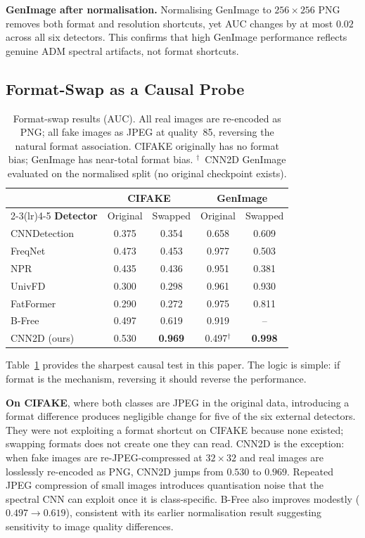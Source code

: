 \documentclass{bmvc2k}
\begin{document}
\noindent\textbf{GenImage after normalisation.}
Normalising GenImage to $256\times256$ PNG removes both format and resolution shortcuts, yet AUC changes by at most $0.02$ across all six detectors. This confirms that high GenImage performance reflects genuine ADM spectral artifacts, not format shortcuts.

\subsection{Format-Swap as a Causal Probe}
\label{sec:swap_results}

\begin{table}[t]
\centering
\small
\setlength{\tabcolsep}{4pt}
\begin{tabular}{lcccc}
\toprule
 & \multicolumn{2}{c}{\textbf{CIFAKE}} & \multicolumn{2}{c}{\textbf{GenImage}} \\
\cmidrule(lr){2-3}\cmidrule(lr){4-5}
\textbf{Detector} & Original & Swapped & Original & Swapped \\
\midrule
CNNDetection~\cite{wang2020cnn} & 0.375 & 0.354 & 0.658 & 0.609 \\
FreqNet~\cite{freqnet}          & 0.473 & 0.453 & 0.977 & 0.503 \\
NPR~\cite{npr}                  & 0.435 & 0.436 & 0.951 & 0.381 \\
UnivFD~\cite{univfd}            & 0.300 & 0.298 & 0.961 & 0.930 \\
FatFormer~\cite{fatformer}      & 0.290 & 0.272 & 0.975 & 0.811 \\
B-Free~\cite{bfree}             & 0.497 & 0.619 & 0.919 & --    \\
CNN2D (ours)                    & 0.530 & \textbf{0.969} & 0.497$^{\dagger}$ & \textbf{0.998} \\
\bottomrule
\end{tabular}
\caption{Format-swap results (AUC). All real images are re-encoded as PNG; all fake images as JPEG at quality~85, reversing the natural format association. CIFAKE originally has no format bias; GenImage has near-total format bias. $^{\dagger}$~CNN2D GenImage evaluated on the normalised split (no original checkpoint exists).}
\label{tab:swap}
\end{table}

Table~\ref{tab:swap} provides the sharpest causal test in this paper. The logic is simple: if format is the mechanism, reversing it should reverse the performance.

\noindent\textbf{On CIFAKE}, where both classes are JPEG in the original data, introducing a format difference produces negligible change for five of the six external detectors. They were not exploiting a format shortcut on CIFAKE because none existed; swapping formats does not create one they can read. CNN2D is the exception: when fake images are re-JPEG-compressed at $32\times32$ and real images are losslessly re-encoded as PNG, CNN2D jumps from $0.530$ to $0.969$. Repeated JPEG compression of small images introduces quantisation noise that the spectral CNN can exploit once it is class-specific. B-Free also improves modestly ($0.497\to0.619$), consistent with its earlier normalisation result suggesting sensitivity to image quality differences.
\end{document}
